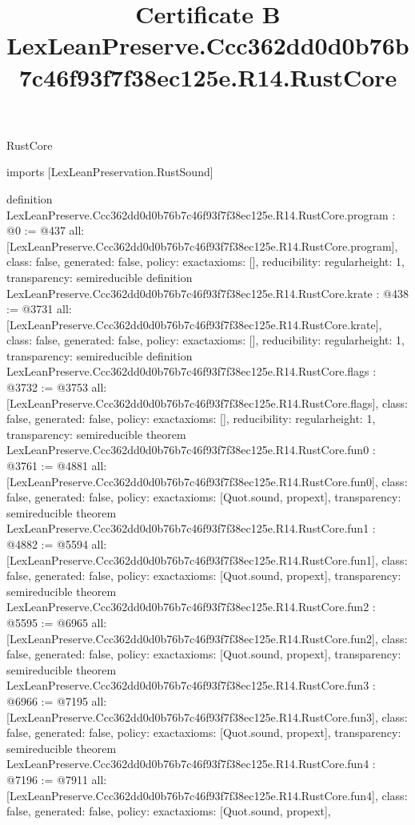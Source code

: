 \begin{lexlean}{RustCore}
\title{Certificate B LexLeanPreserve.Ccc362dd0d0b76b7c46f93f7f38ec125e.R14.RustCore}
\begin{coremodule}
imports [LexLeanPreservation.RustSound]

definition LexLeanPreserve.Ccc362dd0d0b76b7c46f93f7f38ec125e.R14.RustCore.program : @0 := @437 {
  all: [LexLeanPreserve.Ccc362dd0d0b76b7c46f93f7f38ec125e.R14.RustCore.program],
  class: false,
  generated: false,
  policy: exact{axioms: []},
  reducibility: regular{height: 1},
  transparency: semireducible
}
definition LexLeanPreserve.Ccc362dd0d0b76b7c46f93f7f38ec125e.R14.RustCore.krate : @438 := @3731 {
  all: [LexLeanPreserve.Ccc362dd0d0b76b7c46f93f7f38ec125e.R14.RustCore.krate],
  class: false,
  generated: false,
  policy: exact{axioms: []},
  reducibility: regular{height: 1},
  transparency: semireducible
}
definition LexLeanPreserve.Ccc362dd0d0b76b7c46f93f7f38ec125e.R14.RustCore.flags : @3732 := @3753 {
  all: [LexLeanPreserve.Ccc362dd0d0b76b7c46f93f7f38ec125e.R14.RustCore.flags],
  class: false,
  generated: false,
  policy: exact{axioms: []},
  reducibility: regular{height: 1},
  transparency: semireducible
}
theorem LexLeanPreserve.Ccc362dd0d0b76b7c46f93f7f38ec125e.R14.RustCore.fun0 : @3761 := @4881 {
  all: [LexLeanPreserve.Ccc362dd0d0b76b7c46f93f7f38ec125e.R14.RustCore.fun0],
  class: false,
  generated: false,
  policy: exact{axioms: [Quot.sound, propext]},
  transparency: semireducible
}
theorem LexLeanPreserve.Ccc362dd0d0b76b7c46f93f7f38ec125e.R14.RustCore.fun1 : @4882 := @5594 {
  all: [LexLeanPreserve.Ccc362dd0d0b76b7c46f93f7f38ec125e.R14.RustCore.fun1],
  class: false,
  generated: false,
  policy: exact{axioms: [Quot.sound, propext]},
  transparency: semireducible
}
theorem LexLeanPreserve.Ccc362dd0d0b76b7c46f93f7f38ec125e.R14.RustCore.fun2 : @5595 := @6965 {
  all: [LexLeanPreserve.Ccc362dd0d0b76b7c46f93f7f38ec125e.R14.RustCore.fun2],
  class: false,
  generated: false,
  policy: exact{axioms: [Quot.sound, propext]},
  transparency: semireducible
}
theorem LexLeanPreserve.Ccc362dd0d0b76b7c46f93f7f38ec125e.R14.RustCore.fun3 : @6966 := @7195 {
  all: [LexLeanPreserve.Ccc362dd0d0b76b7c46f93f7f38ec125e.R14.RustCore.fun3],
  class: false,
  generated: false,
  policy: exact{axioms: [Quot.sound, propext]},
  transparency: semireducible
}
theorem LexLeanPreserve.Ccc362dd0d0b76b7c46f93f7f38ec125e.R14.RustCore.fun4 : @7196 := @7911 {
  all: [LexLeanPreserve.Ccc362dd0d0b76b7c46f93f7f38ec125e.R14.RustCore.fun4],
  class: false,
  generated: false,
  policy: exact{axioms: [Quot.sound, propext]},
}
\end{coremodule}
\end{lexlean}
